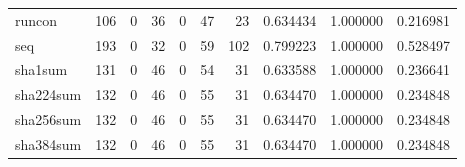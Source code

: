 \begin{longtable}{lrrrrrrrrr}
runcon    &                                                106 &                                                  0 &                                                 36 &                                                  0 &                                                 47 &                                                 23 &                                           0.634434 &                               1.000000 &                             0.216981 \\
seq       &                                                193 &                                                  0 &                                                 32 &                                                  0 &                                                 59 &                                                102 &                                           0.799223 &                               1.000000 &                             0.528497 \\
sha1sum   &                                                131 &                                                  0 &                                                 46 &                                                  0 &                                                 54 &                                                 31 &                                           0.633588 &                               1.000000 &                             0.236641 \\
sha224sum &                                                132 &                                                  0 &                                                 46 &                                                  0 &                                                 55 &                                                 31 &                                           0.634470 &                               1.000000 &                             0.234848 \\
sha256sum &                                                132 &                                                  0 &                                                 46 &                                                  0 &                                                 55 &                                                 31 &                                           0.634470 &                               1.000000 &                             0.234848 \\
sha384sum &                                                132 &                                                  0 &                                                 46 &                                                  0 &                                                 55 &                                                 31 &                                           0.634470 &                               1.000000 &                             0.234848 \\

\end{longtable}
